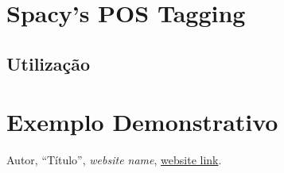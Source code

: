 \documentclass[12pt]{article}
\begin{document}




\section{Spacy's POS Tagging}



\subsection{Utilização}


\section{Exemplo Demonstrativo}







\setcounter{section}{0}
\setcounter{subsection}{0}


\newpage

\appendixpage
\renewcommand{\thesubsection}{\Alph{subsection}}



\newpage

\begin{thebibliography}{99}
	
	
	Autor,
	``Título'',
	\textit{website name},
	\url{website link}.
	
\end{thebibliography}
\end{document}

